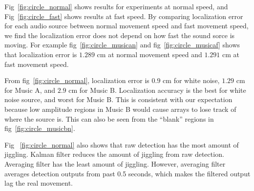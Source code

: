Fig~\ref{fig:circle_normal} shows results for experiments at normal speed, and Fig~\ref{fig:circle_fast} shows results at fast speed. By comparing localization error for each audio source between normal movement speed and fast movement speed, we find the localization error does not depend on how fast the sound sorce is moving. For example fig~\ref{fig:circle_musican} and fig~\ref{fig:circle_musicaf} shows that localization error is $1.289$ cm at normal movement speed and $1.291$ cm at fast movement speed.

From fig~\ref{fig:circle_normal}, localization error is $0.9$ cm for white noise, $1.29$ cm for Music A, and $2.9$ cm for Music B. Localization accuracy is the best for white noise source, and worst for Music B. This is consistent with our expectation because low amplitude regions in Music B would cause arrays to lose track of where the source is. This can also be seen from the ``blank'' regions in fig~\ref{fig:circle_musicbn}.

Fig ~\ref{fig:circle_normal} also shows that raw detection has the most amount of jiggling. Kalman filter reduces the amount of jiggling from raw detection. Averaging filter has the least amount of jiggling. However, averaging filter averages detection outputs from past 0.5 seconds, which makes the filtered output lag the real movement. 
